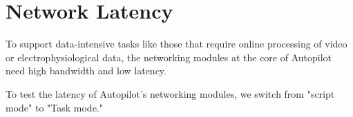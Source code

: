 
\section{Network Latency}
\label{sec:networklatency}

To support data-intensive tasks like those that require online processing of video or electrophysiological data, the networking modules at the core of Autopilot need high bandwidth and low latency. 

To test the latency of Autopilot's networking modules, we switch from "script mode" to "Task mode."